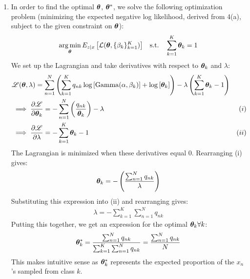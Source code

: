 \documentclass[submit]{harvardml}
\begin{document}
\begin{enumerate}
\begin{enumerate}
      \item
      In order to find the optimal $\boldsymbol{\theta}$, $\boldsymbol{\theta}^*$, we solve the following optimization problem (minimizing the expected negative log likelihood, derived from 4(a), subject to the given constraint on $\boldsymbol{\theta}$):
      \begin{align*}
          \argmin_{\btheta} {E_{z|x}\left[\mcL(\btheta, \{\beta_k\}^K_{k=1}) \right]} \quad \text{s.t.} \quad \sum_{k=1}^K \btheta_k = 1
      \end{align*}
      We set up the Lagrangian and take derivatives with respect to $\boldsymbol{\theta}_k$ and $\lambda$:
      \begin{align*}
          &\mathscr{L}(\boldsymbol{\theta}, \lambda) = \sum_{n=1}^N \left(\sum_{k=1}^K q_{nk} \log \left[\operatorname{Gamma}(\alpha, \beta_k)\right] + \log \left[\boldsymbol{\theta}_k\right]\right) - \lambda \left(\sum_{k=1}^K \boldsymbol{\theta}_k - 1\right)\\
          &\implies \frac{\partial \mathscr{L}}{\partial \boldsymbol{\theta}_k} = - \sum_{n=1}^N \left(\frac{q_{nk}}{\boldsymbol{\theta}_k}\right) - \lambda &(i)\\
          &\implies \frac{\partial \mathscr{L}}{\partial \lambda} = - \sum_{k=1}^K \boldsymbol{\theta}_k - 1 &(ii)
      \end{align*}
      The Lagrangian is minimized when these derivatives equal 0. Rearranging (i) gives:
      \begin{align*}
          \boldsymbol{\theta}_k = - \left(\frac{\sum_{n=1}^N q_{nk}}{\lambda}\right)
      \end{align*}
      Substituting this expression into (ii) and rearranging gives:
      \begin{align*}
          \lambda = - \sum_{k=1}^K \sum_{n=1}^N q_{nk}
      \end{align*}
      Putting this together, we get an expression for the optimal $\boldsymbol{\theta}_k \forall k$:
      \begin{align*}
          \boldsymbol{\theta}_k^* = \frac{\sum_{n=1}^N q_{nk}}{\sum_{k=1}^K \sum_{n=1}^N q_{nk}} = \frac{\sum_{n=1}^N q_{nk}}{N}
      \end{align*}
      This makes intuitive sense as $\boldsymbol{\theta}_k^*$ represents the expected proportion of the $x_n$'s sampled from class $k$.
      

\end{enumerate}
\end{enumerate}
\end{document}
